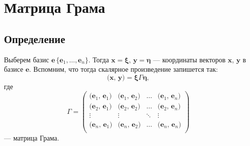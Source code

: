 \section{Матрица Грама}
\subsection{Определение}
\begin{definition}
Выберем базис $\textbf{e}\, \{\textbf{e$_1$},\dots,\textbf{e$_n$}\}$. Тогда $\textbf{x}= \bm\xi$, $\textbf{y} = \bm\eta$ --- координаты векторов $ \textbf{x} $, $ \textbf{y} $ в базисе $ \textbf{e} $. Вспомним, что тогда скалярное произведение запишется так:
$$
\textbf{(x, y)} = \bm\xi \Gamma \bm\eta,
$$
где 
$$
\Gamma = 
\begin{pmatrix}
\textbf{(e$_1$, e$_1$)} & \textbf{(e$_1$, e$_2$)} & \hdots & \textbf{(e$_1$, e$_n$)}\\
\textbf{(e$_2$, e$_1$)} & \textbf{(e$_2$, e$_2$)} & \hdots & \textbf{(e$_2$, e$_n$)}\\
\vdots & \vdots&\ddots & \vdots\\
\textbf{(e$_n$, e$_1$)} & \textbf{(e$_n$, e$_2$)} & \hdots & \textbf{(e$_n$, e$_n$)}\\
\end{pmatrix}
$$
--- матрица Грама.
\end{definition}
